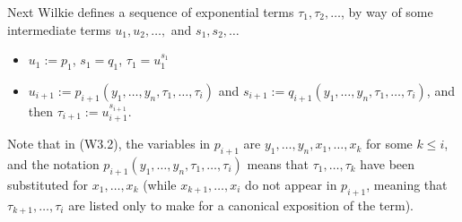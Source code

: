 \documentclass[eqnor,reqno]{amsart}
\theoremstyle{plain}
\theoremstyle{definition}
\begin{document}
Next Wilkie defines a sequence of exponential terms $\tau_1,\tau_2,\dots$, by way of some intermediate terms $u_1,u_2,\dots,$ and $s_1,s_2,\dots$
\begin{itemize}
\item[(W3.1)] $u_1:=p_1$, $s_1=q_1$, $\tau_1=u_1^{s_1}$
\item[(W3.2)]  $u_{i+1}:=p_{i+1}(y_1,\dots,y_n,\tau_1,\dots,\tau_i)$ and $s_{i+1}:=q_{i+1}(y_1,\dots,y_n,\tau_1,\dots,\tau_i)$, and then $\tau_{i+1}:=u_{i+1}^{s_{i+1}}$.
\end{itemize}
Note that in (W3.2), the variables in $p_{i+1}$ are $y_1,\dots,y_n,x_1,\dots,x_{k}$ for some $k\leq  i$, and the notation $p_{i+1}(y_1,\dots,y_n,\tau_1,\dots,\tau_i)$ means that $\tau_1,\dots,\tau_k$ have been substituted for $x_1,\dots,x_k$ (while $x_{k+1},\dots,x_i$ do not appear in $p_{i+1}$, meaning that $\tau_{k+1},\dots,\tau_i$ are listed only to make for a canonical exposition of the term).
\end{document}

